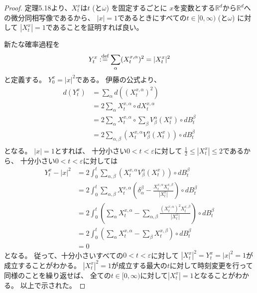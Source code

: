 \documentclass[uplatex]{jsarticle}
\theoremstyle{definition}
\def\ep{\varepsilon}
\def\R{\mathbb{R}}
\def\dfn{:\overset{\mbox{{\scriptsize def}}}{=}}
\begin{document}
\begin{proof}
  定理5.18より、\(X_t^x\)は\(t\) (と\(\omega\)) を固定するごとに
  \(x\)を変数とする\(\R^d\)から\(\R^d\)への微分同相写像であるから、
  \(|x|=1\)であるときにすべての\(t\in [0,\infty)\) (と\(\omega\)) に対して
  \(|X_t^x|=1\)であることを証明すれば良い。

  新たな確率過程を
  \[Y_t^x \dfn \sum_{\alpha}(X_t^{x,\alpha})^2 = |X_t^x|^2\]
  と定義する。
  \(Y_0^x = |x|^2\)である。
  伊藤の公式より、
  \begin{align*}
    d\left(Y_t^x\right)
    &= \sum_{\alpha} d\left( (X_t^{x,\alpha})^2\right) \\
    &= 2 \sum_{\alpha} X_t^{x,\alpha}\circ d X_t^{x,\alpha} \\
    &= 2 \sum_{\alpha} X_t^{x,\alpha}\circ
    \sum_{\beta}V_\beta^\alpha(X_t^x)\circ dB_t^\beta \\
    &= 2 \sum_{\alpha,\beta}
    \left( X_t^{x,\alpha} V_{\beta}^{\alpha}(X_t^x) \right) \circ dB_t^\beta \\
  \end{align*}
  となる。
  \(|x| = 1\)とすれば、
  十分小さい\(0 < t < \ep\)に対して
  \(\frac{1}{2}\leq |X_t^x|\leq 2\)であるから、
  十分小さい\(0 < t < \ep\)に対しては
  \begin{align*}
    Y_t^x - |x|^2
    &= 2 \int_0^t \sum_{\alpha,\beta}
    \left( X_t^{x,\alpha} V_{\beta}^{\alpha}(X_t^x) \right) \circ dB_t^\beta \\
    &= 2 \int_0^t \sum_{\alpha,\beta}
    X_t^{x,\alpha} \left( \delta_{\alpha}^{\beta} -
    \frac{X_t^{x,\alpha}X_t^{x,\beta}}{|X_t^x|} \right) \circ dB_t^\beta \\
    &= 2 \int_0^t \left( \sum_{\alpha}X_t^{x,\alpha} - \sum_{\alpha,\beta}
    \frac{\left( X_t^{x,\alpha}\right)^2X_t^{x,\beta}}{|X_t^x|}
    \right) \circ dB_t^\beta \\
    &= 2 \int_0^t \left( \sum_{\alpha} X_t^{x,\alpha} - \sum_{\beta} X_t^{x,\beta}
    \right) \circ dB_t^\beta \\
    &= 0
  \end{align*}
  となる。
  従って、十分小さいすべての\(0 < t < \ep\)に対して
  \(|X_t^x|^2 = Y_t^x = |x|^2 = 1\)が成立することがわかる。
  \(|X_t^x|^2 = 1\)が成立する最大の\(t\)に対して時刻変更を行って同様のことを繰り返せば、
  全ての\(t\in [0,\infty)\)に対して\(|X_t^x| = 1\)となることがわかる。
  以上で示された。
\end{proof}
\end{document}

